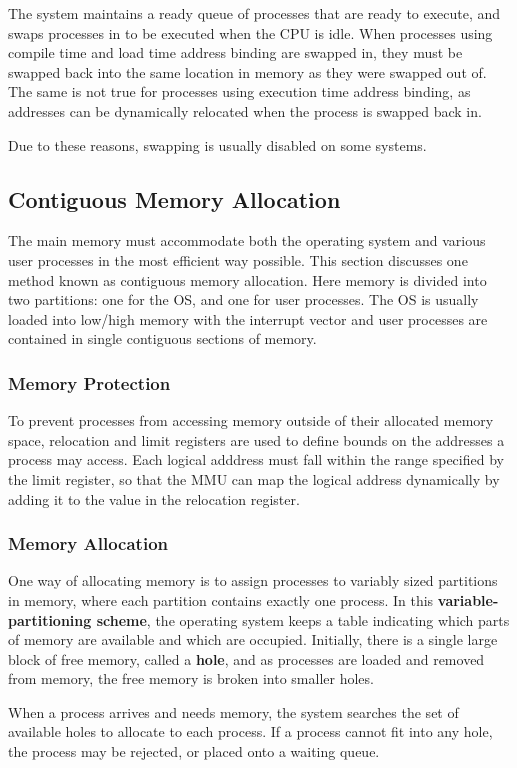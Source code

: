 \documentclass{article}
\begin{document}
The system maintains a ready queue of processes that are ready to
execute, and swaps processes in to be executed when the CPU is idle.
When processes using compile time and load time address binding are
swapped in, they must be swapped back into the same location in memory
as they were swapped out of. The same is not true for processes using
execution time address binding, as addresses can be dynamically
relocated when the process is swapped back in.

Due to these reasons, swapping is usually disabled on some systems.
\subsection{Contiguous Memory Allocation}
The main memory must accommodate both the operating system and various
user processes in the most efficient way possible. This section
discusses one method known as contiguous memory allocation. Here memory
is divided into two partitions: one for the OS, and one for user
processes. The OS is usually loaded into low/high memory with the
interrupt vector and user processes are contained in single contiguous
sections of memory.
\subsubsection{Memory Protection}
To prevent processes from accessing memory outside of their allocated
memory space, relocation and limit registers are used to define bounds
on the addresses a process may access. Each logical adddress must fall
within the range specified by the limit register, so that the MMU can
map the logical address dynamically by adding it to the value in the
relocation register.
\subsubsection{Memory Allocation}
One way of allocating memory is to assign processes to variably sized
partitions in memory, where each partition contains exactly one
process. In this \textbf{variable-partitioning scheme}, the operating
system keeps a table indicating which parts of memory are available and
which are occupied. Initially, there is a single large block of free
memory, called a \textbf{hole}, and as processes are loaded and removed
from memory, the free memory is broken into smaller holes.

When a process arrives and needs memory, the system searches the set of
available holes to allocate to each process. If a process cannot fit
into any hole, the process may be rejected, or placed onto a waiting
queue.
\end{document}

